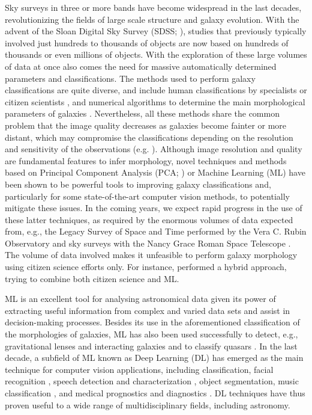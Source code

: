 \documentclass[fleqn,usenatbib]{mnras}
\begin{document}
Sky surveys in three or more bands have become widespread in the last decades, revolutionizing the fields of large scale structure and galaxy evolution. With the advent of the Sloan Digital Sky Survey (SDSS; \citealt{York2000}), studies that previously typically involved just hundreds to thousands of objects are now based on hundreds of thousands or even millions of objects. With the exploration of these large volumes of data at once also comes the need for massive automatically determined parameters and classifications. The methods used to perform galaxy classifications are quite diverse, and include human classifications by specialists \citep{Nair2010,Ann2015} or citizen scientists \citep{lintott2008,lintott2011,Willett2013,Simmons2017}, and numerical algorithms to determine the main morphological parameters of galaxies   \citep{Spiekermann1992,Storrie-Lombardi1992,Walmsley2020}. Nevertheless, all these methods share the common problem that the image quality decreases as galaxies become fainter or more distant, which may compromise the classifications depending on the resolution and sensitivity of the observations (e.g. \citealt{Povic2015}). Although image resolution and quality are fundamental features to infer morphology, novel techniques and  methods based on Principal Component Analysis (PCA; \citealp{Kelly2004,Wjeisinghe2010}) or 
Machine Learning (ML) have been shown to be  powerful tools to improving galaxy classifications \citep{Calleja2004,Yamauchi2005,Huertas2008,Banerji2010,Dominguez2018,Wu2019,Clarke2020, Barchi2020} and, particularly for some state-of-the-art computer vision methods, to potentially mitigate these issues. In the coming years, we expect rapid progress in the use of these latter techniques, as required by the enormous volumes of data expected from, e.g., the Legacy Survey of Space and Time \citep[LSST; ][]{Tyson2002,Axelrod2006} performed by the Vera C. Rubin Observatory and sky surveys with the Nancy Grace Roman Space Telescope \citep{WFIRST}. 
The volume of data involved makes it unfeasible to perform galaxy morphology using citizen science efforts only. For instance, \citet{walmsley2021galaxy} performed a hybrid approach, trying to combine both citizen science and ML.


ML is an excellent tool for analysing astronomical data given its power of extracting useful information from complex and varied data sets and assist in decision-making processes. Besides its use in the aforementioned classification of the morphologies of galaxies, ML has also been used successfully to detect, e.g., gravitational lenses and interacting galaxies and to classify quasars \citep{Freeman2013,Shamir2013,Bom_proc,Bom2017,Ostrovski2017,Ma2019,challenge01,Knabel2020}. In the last decade, a subfield of ML known as Deep Learning (DL) has emerged as the main technique for computer vision applications, including classification, facial recognition \citep{lu2017simultaneous}, speech detection and characterization \citep{abdel2014convolutional,vecchiotti2018convolutional}, object segmentation, music classification \citep{choi2017convolutional}, and medical prognostics and diagnostics \citep{li2018remaining,hannun2019cardiologist}. DL techniques have thus proven useful to a wide range of multidisciplinary fields, including astronomy.
\end{document}
